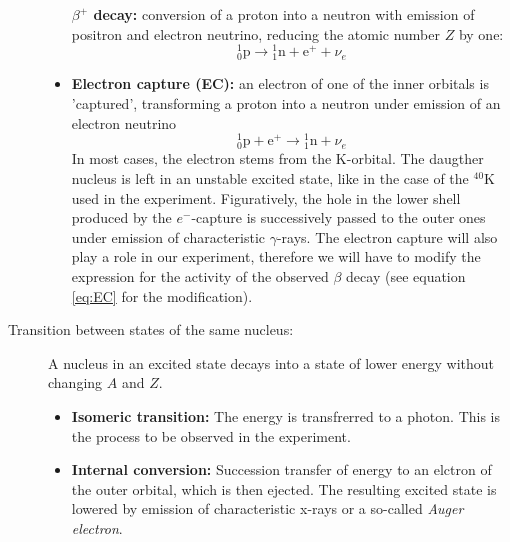 \begin{description}
\begin{itemize}
                \textbf{$\beta^+$ decay:} conversion of a proton into a neutron with emission of positron and 
                electron neutrino, reducing the atomic number $Z$ by one:
                \begin{equation}
                    {}^{1}_{0} \mathrm {p} \to {}^{1}_{1} \mathrm {n} + \mathrm{e}^{+} + \nu_e 
                \end{equation}
            \item
                \textbf{Electron capture (EC):} an electron of one of the inner orbitals is 'captured', transforming a proton 
                into a neutron under emission of an electron neutrino
                \begin{equation}
                    {}^{1}_{0} \mathrm {p} + \mathrm{e}^{+} \to {}^{1}_{1} \mathrm {n} + \nu_e 
                \end{equation}
                In most cases, the electron stems from the K-orbital. The daugther nucleus is left in 
                an unstable excited state, like in the case of the $^{40}$K used in the experiment. 
                Figuratively, the hole in the lower shell produced by the $e^-$-capture is successively 
                passed to the outer ones under emission of characteristic $\gamma$-rays. The
                electron capture will also play a role in our experiment, therefore we will
                have to modify the expression for the activity of the observed $\beta$ decay (see equation
                \eqref{eq:EC} for the modification).

        \end{itemize}
    \item [Transition between states of the same nucleus:] 
        A nucleus in an excited state decays into a state of 
        lower energy without changing $A$ and $Z$.
        \begin{itemize}
            \item
                \textbf{Isomeric transition:} The energy is transfrerred to a photon. This is the process to be observed 
                in the experiment. 
            \item
                \textbf{Internal conversion:} Succession transfer of energy to an elctron of the outer orbital, 
                which is then ejected. The resulting excited state is lowered by emission of characteristic 
                x-rays or a so-called \emph{Auger electron}. 
        \end{itemize}
\end{description}



